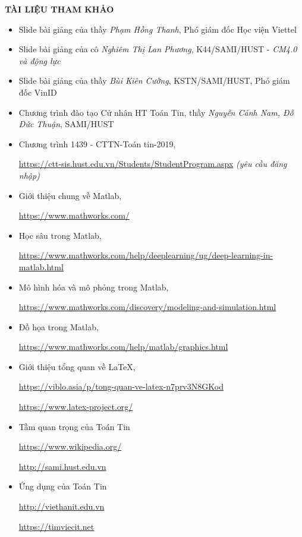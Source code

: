 \documentclass[12pt,a4paper]{report}
\begin{document}
    \newpage
    \begin{center}
        \huge \textbf{TÀI LIỆU THAM KHẢO}
    \end{center}
    \begin{itemize}
        \item Slide bài giảng của thầy \textit{Phạm Hồng Thanh}, Phó giám đốc Học viện Viettel
        \item Slide bài giảng của cô \textit{Nghiêm Thị Lan Phương}, K44/SAMI/HUST - \textit{CM4.0 và động lực}
        \item Slide bài giảng của thầy \textit{Bùi Kiên Cường}, KSTN/SAMI/HUST, Phó giám đốc VinID
        \item Chương trình đào tạo Cử nhân HT Toán Tin, thầy \textit{Nguyễn Cảnh Nam, Đỗ Đức Thuận}, SAMI/HUST 
        \item Chương trình 1439 - CTTN-Toán tin-2019, 
        
        \url{https://ctt-sis.hust.edu.vn/Students/StudentProgram.aspx} \textit{(yêu cầu đăng nhập)}
        
        \item Giới thiệu chung về Matlab,
        
        \url{https://www.mathworks.com/}
       
        \item Học sâu trong Matlab,
        
        \url{https://www.mathworks.com/help/deeplearning/ug/deep-learning-in-matlab.html}
        \item Mô hình hóa và mô phỏng trong Matlab,
        
        \url{https://www.mathworks.com/discovery/modeling-and-simulation.html}
        \item Đồ họa trong Matlab,
        
        \url{https://www.mathworks.com/help/matlab/graphics.html}
        \item Giới thiệu tổng quan về \LaTeX ,
        
        \url{https://viblo.asia/p/tong-quan-ve-latex-n7prv3N8GKod}
        
        \url{https://www.latex-project.org/}
        
        \item Tầm quan trọng của Toán Tin
        
        \url{https://www.wikipedia.org/}
        
        \url{http://sami.hust.edu.vn}
        \item Ứng dụng của Toán Tin
        
        \url{http://viethanit.edu.vn}
        
        \url{https://timviecit.net}
        
    \end{itemize}
    
\end{document}
